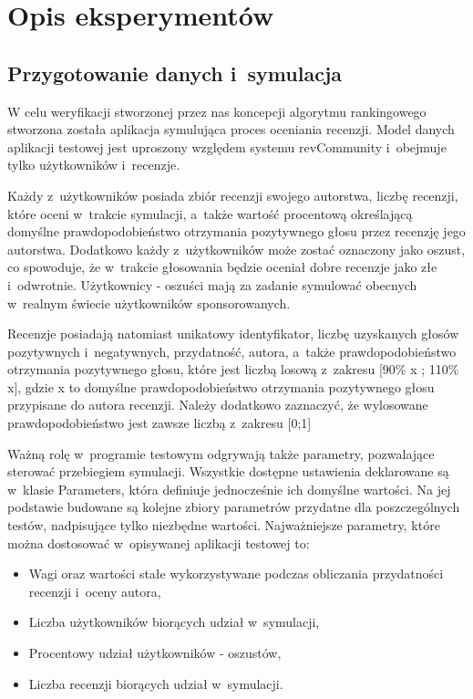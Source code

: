 \section{Opis eksperymentów}

\subsection{Przygotowanie danych i~symulacja}

W celu weryfikacji stworzonej przez nas koncepcji algorytmu rankingowego stworzona została aplikacja symulująca proces oceniania recenzji. Model danych aplikacji testowej jest uproszony względem systemu revCommunity i~obejmuje tylko użytkowników i~recenzje. 

Każdy z~użytkowników posiada zbiór recenzji swojego autorstwa, liczbę recenzji, które oceni w~trakcie symulacji, a~także wartość procentową określającą  domyślne prawdopodobieństwo otrzymania pozytywnego głosu przez recenzję jego autorstwa. Dodatkowo każdy z~użytkowników może zostać oznaczony jako oszust, co spowoduje, że w~trakcie głosowania będzie oceniał dobre recenzje jako złe i~odwrotnie. Użytkownicy - oszuści mają za zadanie symulować obecnych w~realnym świecie użytkowników sponsorowanych.

Recenzje posiadają natomiast unikatowy identyfikator, liczbę uzyskanych głosów pozytywnych i~negatywnych, przydatność, autora, a~także prawdopodobieństwo otrzymania pozytywnego głosu, które jest liczbą losową z~zakresu [90\% x ; 110\% x], gdzie x to domyślne prawdopodobieństwo otrzymania pozytywnego głosu przypisane do autora recenzji. Należy dodatkowo zaznaczyć, że wylosowane prawdopodobieństwo jest zawsze liczbą z~zakresu [0;1]

Ważną rolę w~programie testowym odgrywają także parametry, pozwalające sterować przebiegiem symulacji. Wszystkie dostępne ustawienia deklarowane są w~klasie Parameters, która definiuje jednocześnie ich domyślne wartości. Na jej podstawie budowane są kolejne zbiory parametrów przydatne dla poszczególnych testów, nadpisujące tylko niezbędne wartości. Najważniejsze parametry, które można dostosować w~opisywanej aplikacji testowej to:

\begin{itemize}
\item Wagi oraz wartości stałe wykorzystywane podczas obliczania przydatności recenzji i~oceny autora,
\item Liczba użytkowników biorących udział w~symulacji,
\item Procentowy udział użytkowników - oszustów,
\item Liczba recenzji biorących udział w~symulacji.
\end{itemize}


